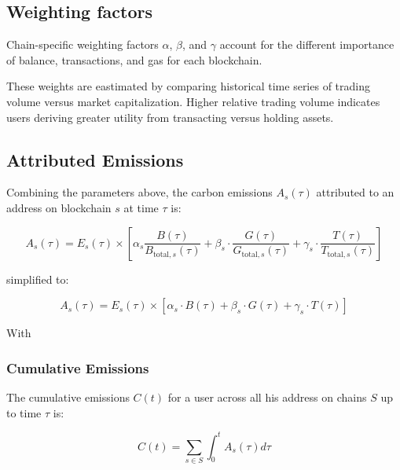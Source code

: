 \documentclass[11pt]{report}
\begin{document}
\subsection{Weighting factors}
Chain-specific weighting factors $\alpha$, $\beta$, and $\gamma$ account for the different importance of balance, transactions, and gas for each blockchain.

These weights are eastimated by comparing historical time series of trading volume versus market capitalization. Higher relative trading volume indicates users deriving greater utility from transacting versus holding assets.


\subsection{Attributed Emissions}

Combining the parameters above, the carbon emissions \(A_s(\tau)\) attributed to an address on blockchain $s$ at time $\tau$ is:

\begin{equation}
    A_{s}(\tau) = E_{s}(\tau) \times 
        [
        \alpha_{s}\frac{B(\tau)}{B_{\text{total},s}(\tau)} + 
        \beta_{s} \cdot  \frac{G(\tau)}{G_{\text{total},s}(\tau)} + 
        \gamma_{s} \cdot \frac{T(\tau)}{T_{\text{total},s}(\tau)}
        ]
\end{equation}

simplified to:



\begin{equation}
    A_{s}(\tau) = E_{s}(\tau) \times [\alpha_{s} \cdot B(\tau) + \beta_{s} \cdot G(\tau) + \gamma_{s} \cdot T(\tau)]
\end{equation}

With 



\subsubsection*{Cumulative Emissions}

The cumulative emissions $C(t)$ for a user across all his address on chains $S$ up to time $\tau$ is:

\begin{equation}
    C(t) = \sum_{s \in S} \int_{0}^{t} A_s(\tau) d\tau
\end{equation}
\end{document}
